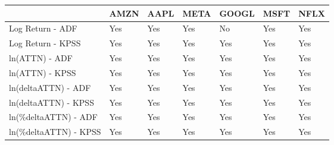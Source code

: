 \begin{tabular}{lllllll}
\toprule
{} & AMZN & AAPL & META & GOOGL & MSFT & NFLX \\
\midrule
Log Return - ADF      &  Yes &  Yes &  Yes &    No &  Yes &  Yes \\
Log Return - KPSS     &  Yes &  Yes &  Yes &   Yes &  Yes &  Yes \\
ln(ATTN) - ADF        &  Yes &  Yes &  Yes &   Yes &  Yes &  Yes \\
ln(ATTN) - KPSS       &  Yes &  Yes &  Yes &   Yes &  Yes &  Yes \\
ln(deltaATTN) - ADF   &  Yes &  Yes &  Yes &   Yes &  Yes &  Yes \\
ln(deltaATTN) - KPSS  &  Yes &  Yes &  Yes &   Yes &  Yes &  Yes \\
ln(\%deltaATTN) - ADF  &  Yes &  Yes &  Yes &   Yes &  Yes &  Yes \\
ln(\%deltaATTN) - KPSS &  Yes &  Yes &  Yes &   Yes &  Yes &  Yes \\
\bottomrule
\end{tabular}
